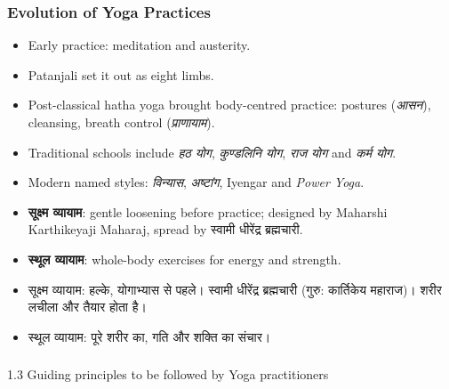 \begin{frame}[fragile]\frametitle{Evolution of Yoga Practices}

      \begin{itemize}
		\item Early practice: meditation and austerity.
		\item Patanjali set it out as eight limbs.
		\item Post-classical hatha yoga brought body-centred practice: postures (\textit{आसन}), cleansing, breath control (\textit{प्राणायाम}).
		\item Traditional schools include \textit{हठ योग}, \textit{कुण्डलिनि योग}, \textit{राज योग} and \textit{कर्म योग}.
		\item Modern named styles: \textit{विन्यास}, \textit{अष्टांग}, Iyengar and \textit{Power Yoga}.
		\item \textbf{सूक्ष्म व्यायाम}: gentle loosening before practice; designed by Maharshi Karthikeyaji Maharaj, spread by स्वामी धीरेंद्र ब्रह्मचारी.
		\item \textbf{स्थूल व्यायाम}: whole-body exercises for energy and strength.

		\item सूक्ष्म व्यायाम: हल्के, योगाभ्यास से पहले। स्वामी धीरेंद्र ब्रह्मचारी (गुरु: कार्तिकेय महाराज)। शरीर लचीला और तैयार होता है।
		\item स्थूल व्यायाम: पूरे शरीर का, गति और शक्ति का संचार।
	  \end{itemize}

\end{frame}



\begin{frame}[fragile]\frametitle{}
\begin{center}
{\Large 1.3 Guiding principles to be followed by Yoga practitioners}
\end{center}
\end{frame}

